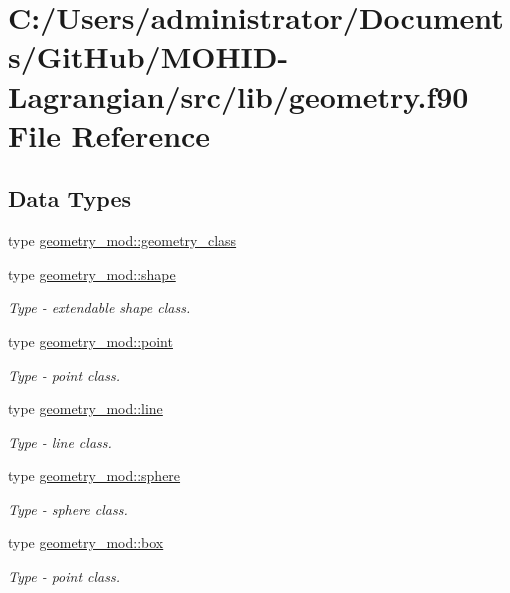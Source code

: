 \hypertarget{geometry_8f90}{}\section{C\+:/\+Users/administrator/\+Documents/\+Git\+Hub/\+M\+O\+H\+I\+D-\/\+Lagrangian/src/lib/geometry.f90 File Reference}
\label{geometry_8f90}
\subsection*{Data Types}
\begin{DoxyCompactItemize}
\item 
type \hyperlink{structgeometry__mod_1_1geometry__class}{geometry\+\_\+mod\+::geometry\+\_\+class}
\item 
type \hyperlink{structgeometry__mod_1_1shape}{geometry\+\_\+mod\+::shape}
\begin{DoxyCompactList}\small\item\em Type -\/ extendable shape class. \end{DoxyCompactList}\item 
type \hyperlink{structgeometry__mod_1_1point}{geometry\+\_\+mod\+::point}
\begin{DoxyCompactList}\small\item\em Type -\/ point class. \end{DoxyCompactList}\item 
type \hyperlink{structgeometry__mod_1_1line}{geometry\+\_\+mod\+::line}
\begin{DoxyCompactList}\small\item\em Type -\/ line class. \end{DoxyCompactList}\item 
type \hyperlink{structgeometry__mod_1_1sphere}{geometry\+\_\+mod\+::sphere}
\begin{DoxyCompactList}\small\item\em Type -\/ sphere class. \end{DoxyCompactList}\item 
type \hyperlink{structgeometry__mod_1_1box}{geometry\+\_\+mod\+::box}
\begin{DoxyCompactList}\small\item\em Type -\/ point class. \end{DoxyCompactList}\end{DoxyCompactItemize}
